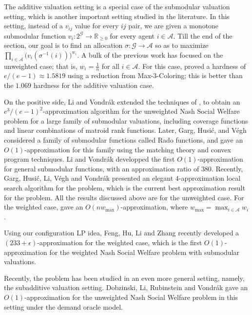 \documentclass{theoretics}
\newcommand\calA{{\mathcal{A}}}
\newcommand\calG{{\mathcal{G}}}
\newcommand{\R}{{\mathbb{R}}}
\begin{document}
The additive valuation setting is a special case of the submodular valuation setting, which is another important setting studied in the literature. In this setting, instead of a $v_{ij}$ value for every $ij$ pair, we are given a monotone submodular function $v_i: 2^{\calG} \to \R_{\geq 0}$ for every agent $i \in \calA$. Till the end of the section, our goal is to find an allocation $\sigma: \calG \to \calA$ so as to maximize $\prod_{i \in \calA} \Big(v_i(\sigma^{-1}(i))\Big)^{w_i}$. %
A bulk of the previous work has focused on the unweighted case; that is, $w_i = \frac1n$ for all $i \in \calA$. For this case, \cite{GKK23} proved a hardness of $e/(e-1)\approx 1.5819$ using a reduction from Max-3-Coloring; this is better than the $1.069$ hardness for the additive valuation case. 

On the positive side, Li and Vondr\'{a}k \cite{LV21} extended the techniques of \cite{AGS17}, to obtain an $e^3/(e-1)^2$-approximation algorithm for the unweighted Nash Social Welfare problem for a large family of submodular valuations, including coverage functions and linear combinations of matroid rank functions. Later, Garg, Husi\'{c}, and V\'{e}gh \cite{GHV21} considered a family of submodular functions called Rado functions, and gave an $O(1)$-approximation for this family using the matching theory and convex program techniques.  Li and Vondr\'{a}k \cite{LV22} developped the first $O(1)$-approximation for general submodular functions, with an approximation ratio of $380$.  Recently, Garg, Husi\'{c}, Li, V\'{e}gh and Vondr\'{a}k \cite{GHL23} presented an elegant $4$-approximation local search algorithm for the problem, which is the current best approximation result for the problem.  All the results discussed above are for the unweighted case. For the weighted case, \cite{GHL23} gave an $O(nw_{\max})$-approximation, where $w_{\max} = \max_{i \in \calA} w_i$. 

Using our configuration LP idea, Feng, Hu, Li and Zhang \cite{FHLZ25} recently developed a $(233+\epsilon)$-approximation for the weighted case, which is the first $O(1)$-approximation for the weighted Nash Social Welfare problem with submodular valuations. 


Recently, the problem has been studied in an even more general setting, namely, the subadditive valuation setting.  Dobzinski, Li, Rubinstein and Vondr\'{a}k \cite{DLR23} gave an $O(1)$-approximation for the unweighted Nash Social Welfare problem in this setting under the demand oracle model.
\end{document}
